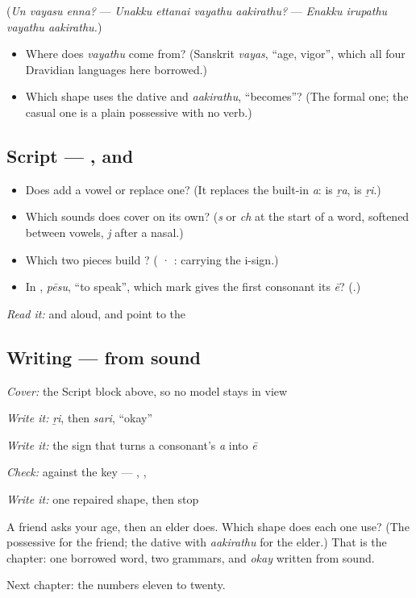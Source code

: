 (\emph{Un vayasu enna?} — \emph{Unakku ettanai vayathu aakirathu?} — \emph{Enakku irupathu vayathu aakirathu.})

\begin{itemize}
\raggedright
  \item Where does \emph{vayathu} come from? (Sanskrit \emph{vayas}, \textquotedblleft{}age, vigor\textquotedblright{}, which all four Dravidian languages here borrowed.)
  \item Which shape uses the dative and \emph{aakirathu}, \textquotedblleft{}becomes\textquotedblright{}? (The formal one; the casual one is a plain possessive with no verb.)
\end{itemize}

\subsection*{Script — ,  and }
\begin{itemize}
\raggedright
  \item Does \textbf{} add a vowel or replace one? (It replaces the built-in \emph{a}: \textbf{} is \emph{ṟa}, \textbf{} is \emph{ṟi}.)
  \item Which sounds does \textbf{} cover on its own? (\emph{s} or \emph{ch} at the start of a word, softened between vowels, \emph{j} after a nasal.)
  \item Which two pieces build \textbf{}? (\textbf{} · \textbf{}:  carrying the i-sign.)
  \item In \textbf{}, \emph{pēsu}, \textquotedblleft{}to speak\textquotedblright{}, which mark gives the first consonant its \emph{ē}? (\textbf{}.)
\end{itemize}

\emph{Read it:} \textbf{} and \textbf{} aloud, and point to the 

\subsection*{Writing — from sound}
\emph{Cover:} the Script block above, so no model stays in view

\emph{Write it:} \emph{ṟi}, then \emph{sari}, \textquotedblleft{}okay\textquotedblright{}

\emph{Write it:} the sign that turns a consonant's \emph{a} into \emph{ē}

\emph{Check:} against the key — \textbf{}, \textbf{}, \textbf{}

\emph{Write it:} one repaired shape, then stop

\begin{tcolorbox}[breakable,colback=teal!4,colframe=teal!35!black,title={Before you move on}]
A friend asks your age, then an elder does. Which shape does each one use? (The possessive for the friend; the dative with \emph{aakirathu} for the elder.) That is the chapter: one borrowed word, two grammars, and \emph{okay} written from sound.

Next chapter: the numbers eleven to twenty.
\end{tcolorbox}
